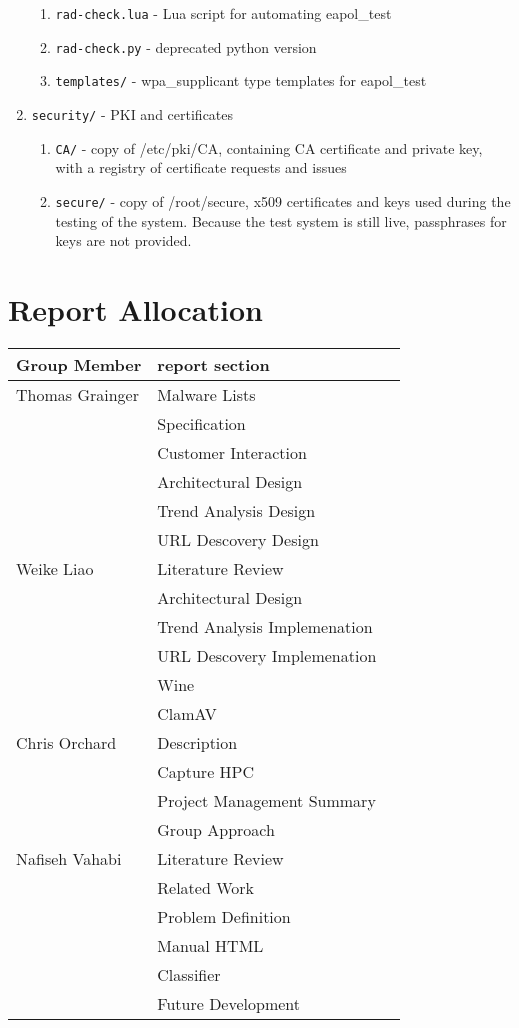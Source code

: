 \begin{enumerate}
\begin{enumerate}
 \item\texttt{rad-check.lua} - Lua script for automating eapol\_test
 \item\texttt{rad-check.py} - deprecated python version
 \item\texttt{templates/} - wpa\_supplicant type templates for eapol\_test
\end{enumerate}
\item\texttt{security/} - PKI and certificates
\begin{enumerate}
 \item\texttt{CA/} - copy of /etc/pki/CA, containing CA certificate and private key,
                with a registry of certificate requests and issues 
 \item\texttt{secure/} - copy of /root/secure, x509 certificates and keys used during
                the testing of the system. Because the test system is still
                live, passphrases for keys are not provided.
\end{enumerate}
\end{enumerate}

\clearpage
\section{Report Allocation}
\label{sec:words}
\begin{center}
\begin{tabularx}{\linewidth}{|XXX|}
\hline
Group Member & report section\\ \hline
Thomas Grainger & Malware Lists\\
& Specification\\
& Customer Interaction\\
& Architectural Design\\
& Trend Analysis Design\\
& URL Descovery Design\\ \hline

Weike Liao & Literature Review \\
& Architectural Design \\
& Trend Analysis Implemenation \\
& URL Descovery Implemenation \\
& Wine \\
& ClamAV \\ \hline

Chris Orchard & Description \\
& Capture HPC \\
& Project Management Summary \\
& Group Approach \\ \hline

Nafiseh Vahabi & Literature Review  \\
& Related Work \\
& Problem Definition \\
& Manual HTML \\
& Classifier \\
& Future Development \\ \hline
\hline
\end{tabularx}
\end{center}